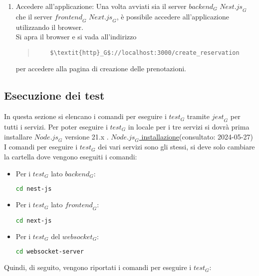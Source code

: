 \begin{enumerate}
\item Accedere all'applicazione:
Una volta avviati sia il server $\textit{backend}_G$ $\textit{Nest.js}_G$ che il server $\textit{frontend}_G$ $\textit{Next.js}_G$, è possibile accedere all'applicazione utilizzando il browser. \\ Si apra il browser e si vada all'indirizzo 
\begin{quote}
\begin{verbatim}
    $\textit{http}_G$://localhost:3000/create_reservation
\end{verbatim}
\end{quote}
per accedere alla pagina di creazione delle prenotazioni.

\end{enumerate}

\subsection{Esecuzione dei test}
In questa sezione si elencano i comandi per eseguire i $\textit{test}_G$ tramite $\textit{jest}_G$ per tutti i servizi.
Per poter eseguire i $\textit{test}_G$ in locale per i tre servizi si dovrà prima installare $\textit{Node.js}_G$ versione 21.x . \href{https://nodejs.org/en/download/package-manager/current}{$\textit{Node.js}_G$ installazione}(consultato: 2024-05-27) \\
I comandi per eseguire i $\textit{test}_G$ dei vari servizi sono gli stessi, si deve solo cambiare la cartella dove vengono eseguiti i comandi:
\begin{itemize}
\item Per i $\textit{test}_G$ lato $\textit{backend}_G$:
\begin{lstlisting}[language=bash]
cd nest-js
\end{lstlisting}
\item Per i $\textit{test}_G$ lato $\textit{frontend}_G$:
\begin{lstlisting}[language=bash]
cd next-js
\end{lstlisting}
\item Per i $\textit{test}_G$ del $\textit{websocket}_G$:
\begin{lstlisting}[language=bash]
cd websocket-server
\end{lstlisting}
\end{itemize}
Quindi, di seguito, vengono riportati i comandi per eseguire i $\textit{test}_G$:
